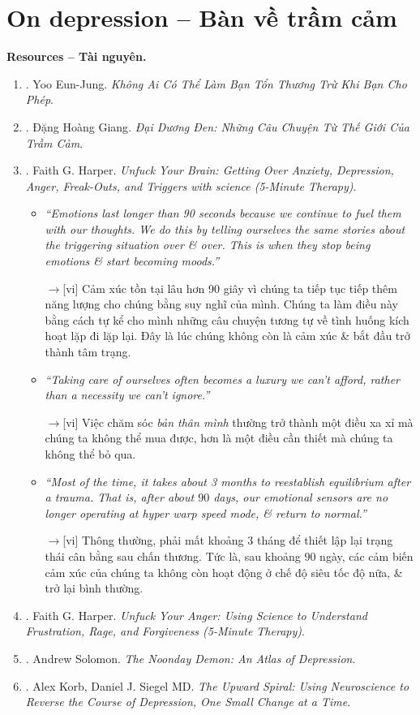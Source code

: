 \documentclass[12pt,twoside]{book}
\begin{document}
\section{On depression -- Bàn về trầm cảm}
{\bf \textsf{Resources -- Tài nguyên.}}
\begin{enumerate}
	\item \cite{Eun-Jung_hurt_VN}. {\sc Yoo Eun-Jung}. {\it Không Ai Có Thể Làm Bạn Tổn Thương Trừ Khi Bạn Cho Phép}.
	\item \cite{Giang_dai_duong_den}. {\sc Đặng Hoàng Giang}. {\it Đại Dương Đen: Những Câu Chuyện Từ Thế Giới Của Trầm Cảm}.
	\item \cite{Harper_unfuck_brain}. {\sc Faith G. Harper}. {\it Unfuck Your Brain: Getting Over Anxiety, Depression, Anger, Freak-Outs, and Triggers with science (5-Minute Therapy)}.
	\begin{itemize}
		\item {\it``Emotions last longer than 90 seconds because we continue to fuel them with our thoughts. We do this by telling ourselves the same stories about the triggering situation over \& over. This is when they stop being emotions \& start becoming moods.''}
		
		{\sf[en]$\to$[vi]} Cảm xúc tồn tại lâu hơn 90 giây vì chúng ta tiếp tục tiếp thêm năng lượng cho chúng bằng suy nghĩ của mình. Chúng ta làm điều này bằng cách tự kể cho mình những câu chuyện tương tự về tình huống kích hoạt lặp đi lặp lại. Đây là lúc chúng không còn là cảm xúc \& bắt đầu trở thành tâm trạng.
		
		\item {\it``Taking care of {\rm ourselves} often becomes a luxury we can't afford, rather than a necessity we can't ignore.''}
		
		{\sf[en]$\to$[vi]} Việc chăm sóc {\it bản thân mình} thường trở thành một điều xa xỉ mà chúng ta không thể mua được, hơn là một điều cần thiết mà chúng ta không thể bỏ qua.
		
		\item {\it``Most of the time, it takes about 3 months to reestablish equilibrium after a trauma. That is, after about $90$ days, our emotional sensors are no longer operating at hyper warp speed mode, \& return to normal.''}
		
		{\sf[en]$\to$[vi]} Thông thường, phải mất khoảng 3 tháng để thiết lập lại trạng thái cân bằng sau chấn thương. Tức là, sau khoảng $90$ ngày, các cảm biến cảm xúc của chúng ta không còn hoạt động ở chế độ siêu tốc độ nữa, \& trở lại bình thường.
	\end{itemize}
	\item \cite{Harper_unfuck_anger}. {\sc Faith G. Harper}. {\it Unfuck Your Anger: Using Science to Understand Frustration, Rage, and Forgiveness (5-Minute Therapy)}.
	\item \cite{Solomon_depression}. {\sc Andrew Solomon}. {\it The Noonday Demon: An Atlas of Depression}.
	\item \cite{Korb_Siegel_upward_spiral}. {\sc Alex Korb, Daniel J. Siegel MD}. {\it The Upward Spiral: Using Neuroscience to Reverse the Course of Depression, One Small Change at a Time}.
\end{enumerate}
\end{document}
